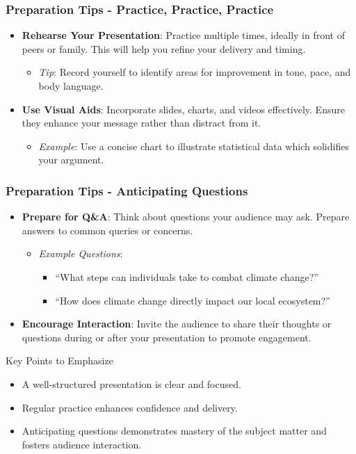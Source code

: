 \documentclass[aspectratio=169]{beamer}
\begin{document}
\begin{frame}[fragile]
    \frametitle{Preparation Tips - Practice, Practice, Practice}
    \begin{itemize}
        \item \textbf{Rehearse Your Presentation}: Practice multiple times, ideally in front of peers or family. This will help you refine your delivery and timing.
        \begin{itemize}
            \item \textit{Tip}: Record yourself to identify areas for improvement in tone, pace, and body language.
        \end{itemize}

        \item \textbf{Use Visual Aids}: Incorporate slides, charts, and videos effectively. Ensure they enhance your message rather than distract from it.
        \begin{itemize}
            \item \textit{Example}: Use a concise chart to illustrate statistical data which solidifies your argument.
        \end{itemize}
    \end{itemize}
\end{frame}

\begin{frame}[fragile]
    \frametitle{Preparation Tips - Anticipating Questions}
    \begin{itemize}
        \item \textbf{Prepare for Q\&A}: Think about questions your audience may ask. Prepare answers to common queries or concerns.
        \begin{itemize}
            \item \textit{Example Questions}:
            \begin{itemize}
                \item “What steps can individuals take to combat climate change?”
                \item “How does climate change directly impact our local ecosystem?”
            \end{itemize}
        \end{itemize}

        \item \textbf{Encourage Interaction}: Invite the audience to share their thoughts or questions during or after your presentation to promote engagement.
    \end{itemize}

    \begin{block}{Key Points to Emphasize}
        \begin{itemize}
            \item A well-structured presentation is clear and focused.
            \item Regular practice enhances confidence and delivery.
            \item Anticipating questions demonstrates mastery of the subject matter and fosters audience interaction.
        \end{itemize}
    \end{block}
\end{frame}
\end{document}
